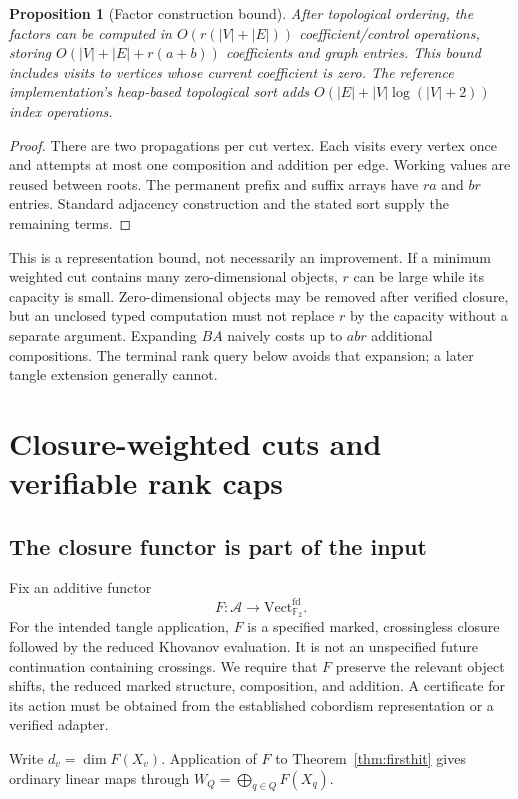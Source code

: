 \documentclass[11pt,letterpaper]{article}
\newtheorem{proposition}[theorem]{Proposition}
\theoremstyle{definition}\newtheorem{definition}[theorem]{Definition}
\theoremstyle{remark}\newtheorem{remark}[theorem]{Remark}
\newcommand{\F}{\mathbb F_2}
\begin{document}
\begin{proposition}[Factor construction bound]\label{prop:factorcost}
After topological ordering, the factors can be computed in
$O(r(|V|+|E|))$ coefficient/control operations, storing
$O(|V|+|E|+r(a+b))$ coefficients and graph entries. This bound includes
visits to vertices whose current coefficient is zero. The reference
implementation's heap-based topological sort adds
$O(|E|+|V|\log(|V|+2))$ index operations.
\end{proposition}
\begin{proof}
There are two propagations per cut vertex. Each visits every vertex once
and attempts at most one composition and addition per edge. Working values
are reused between roots. The permanent prefix and suffix arrays have
$ra$ and $br$ entries. Standard adjacency construction and the stated sort
supply the remaining terms.
\end{proof}

This is a representation bound, not necessarily an improvement. If a minimum
weighted cut contains many zero-dimensional objects, $r$ can be large while
its capacity is small. Zero-dimensional objects may be removed after verified
closure, but an unclosed typed computation must not replace $r$ by the
capacity without a separate argument. Expanding $BA$ naively costs up to
$abr$ additional compositions. The terminal rank query below avoids that
expansion; a later tangle extension generally cannot.

\section{Closure-weighted cuts and verifiable rank caps}
\subsection{The closure functor is part of the input}
Fix an additive functor
\[
F:\mathcal A\longrightarrow \mathrm{Vect}_{\F}^{\mathrm{fd}}.
\]
For the intended tangle application, $F$ is a specified marked, crossingless
closure followed by the reduced Khovanov evaluation. It is not an unspecified
future continuation containing crossings. We require that $F$ preserve the
relevant object shifts, the reduced marked structure, composition, and
addition. A certificate for its action must be obtained from the established
cobordism representation or a verified adapter.

Write $d_v=\dim F(X_v)$. Application of $F$ to
Theorem~\ref{thm:firsthit} gives ordinary linear maps through
$W_Q=\bigoplus_{q\in Q}F(X_q)$.
\end{document}
